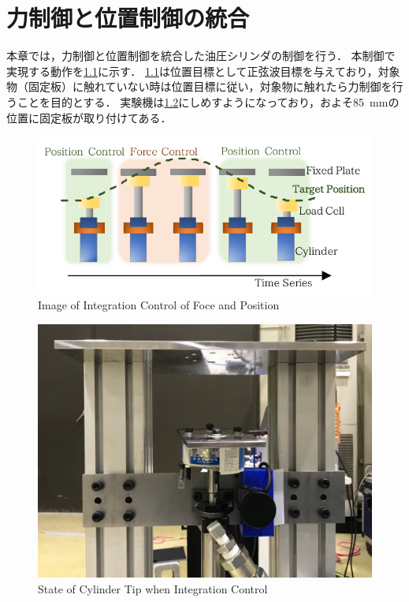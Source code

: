 \chapter{力制御と位置制御の統合}
\label{sec:IntegrationControl}
本章では，力制御と位置制御を統合した油圧シリンダの制御を行う．
本制御で実現する動作を\figname\ref{fig5:forceandpositionIMAGE}に示す．
\figname\ref{fig5:forceandpositionIMAGE}は位置目標として正弦波目標を与えており，対象物（固定板）に触れていない時は位置目標に従い，対象物に触れたら力制御を行うことを目的とする．
実験機は\figname\ref{fig:Integ_system}にしめすようになっており，およそ\SI{85}{mm}の位置に固定板が取り付けてある．

\begin{figure}[t]
    \centering
        \includegraphics[keepaspectratio, scale=.9]{contents/IntegrationControl/figure/forceandpositionIMAGE.pdf}
        \caption{Image of Integration Control of Foce and Position}
        \label{fig5:forceandpositionIMAGE}
\end{figure}
\begin{figure}[t]
    \centering
        \includegraphics[keepaspectratio, width = .6\linewidth]{contents/IntegrationControl/figure/Integ_system.png}
        \caption{State of Cylinder Tip when Integration Control}
        \label{fig:Integ_system}
\end{figure}

